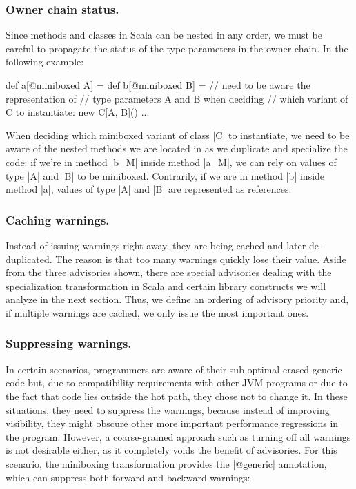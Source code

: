 \subsubsection{Owner chain status.} Since methods and classes in Scala can be nested in any order, we must be careful to propagate the status of the type parameters in the owner chain. In the following example:

\begin{lstlisting-nobreak}
 def a[@miniboxed A] = {
   def b[@miniboxed B] = {
     // need to be aware the representation of
     // type parameters A and B when deciding
     // which variant of C to instantiate:
     new C[A, B]()
   }
   ...
 }
\end{lstlisting-nobreak}

When deciding which miniboxed variant of class |C| to instantiate, we need to be aware of the nested methods we are located in as we duplicate and specialize the code: if we're in method |b_M| inside method |a_M|, we can rely on values of type |A| and |B| to be miniboxed. Contrarily, if we are in method |b| inside method |a|, values of type |A| and |B| are represented as references.

\subsubsection{Caching warnings.} Instead of issuing warnings right away, they are being cached and later de-duplicated. The reason is that too many warnings quickly lose their value. Aside from the three advisories shown, there are special advisories dealing with the specialization transformation in Scala and certain library constructs we will analyze in the next section. Thus, we define an ordering of advisory priority and, if multiple warnings are cached, we only issue the most important ones.

\subsubsection{Suppressing warnings.} In certain scenarios, programmers are aware of their sub-optimal erased generic code but, due to compatibility requirements with other JVM programs or due to the fact that code lies outside the hot path, they chose not to change it. In these situations, they need to suppress the warnings, because instead of improving visibility, they might obscure other more important performance regressions in the program. However, a coarse-grained approach such as turning off all warnings is not desirable either, as it completely voids the benefit of advisories. For this scenario, the miniboxing transformation provides the |@generic| annotation, which can suppress both forward and backward warnings:

